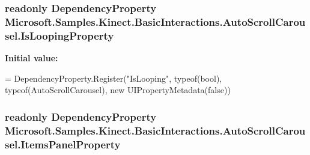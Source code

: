 \hypertarget{class_microsoft_1_1_samples_1_1_kinect_1_1_basic_interactions_1_1_auto_scroll_carousel_aeb28a8282af2f8a132bca15c785a1e1c}{
\subsubsection[{Is\-Looping\-Property}]{\setlength{\rightskip}{0pt plus 5cm}readonly Dependency\-Property Microsoft.\-Samples.\-Kinect.\-Basic\-Interactions.\-Auto\-Scroll\-Carousel.\-Is\-Looping\-Property\hspace{0.3cm}{\ttfamily [static]}}}\label{class_microsoft_1_1_samples_1_1_kinect_1_1_basic_interactions_1_1_auto_scroll_carousel_aeb28a8282af2f8a132bca15c785a1e1c}
{\bfseries Initial value\-:}
\begin{DoxyCode}
=
            DependencyProperty.Register(\textcolor{stringliteral}{"IsLooping"}, typeof(\textcolor{keywordtype}{bool}), typeof(AutoScrollCarousel), \textcolor{keyword}{new} 
      UIPropertyMetadata(\textcolor{keyword}{false}))
\end{DoxyCode}
\hypertarget{class_microsoft_1_1_samples_1_1_kinect_1_1_basic_interactions_1_1_auto_scroll_carousel_a29cb7cd7fba94c71617aa91d026680f5}{
\subsubsection[{Items\-Panel\-Property}]{\setlength{\rightskip}{0pt plus 5cm}readonly Dependency\-Property Microsoft.\-Samples.\-Kinect.\-Basic\-Interactions.\-Auto\-Scroll\-Carousel.\-Items\-Panel\-Property\hspace{0.3cm}{\ttfamily [static]}}}\label{class_microsoft_1_1_samples_1_1_kinect_1_1_basic_interactions_1_1_auto_scroll_carousel_a29cb7cd7fba94c71617aa91d026680f5}
